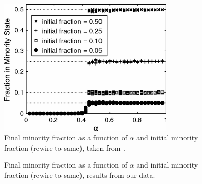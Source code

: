 \documentclass[11pt]{article}
\begin{document}
\begin{figure}
  \centering
  \includegraphics[height=65mm]{rwToSameBifDiag}
  \caption{Final minority fraction as a function of $\alpha$ and initial minority fraction (rewire-to-same), taken from \cite{durret:pnas12}.}
  \label{fig:durretRWtoSameBD}
\end{figure}

\begin{figure}
  \centering
  \hspace{3mm}
  \caption{Final minority fraction as a function of $\alpha$ and initial minority fraction (rewire-to-same), results from our data.}
  \label{fig:myRWtoSameBD}
\end{figure}
\end{document}
